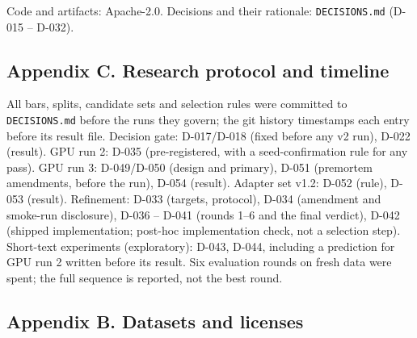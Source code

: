 \documentclass[
  10pt,
]{article}
\begin{document}
Code and artifacts: Apache-2.0. Decisions and their rationale:
\texttt{DECISIONS.md} (D-015 -- D-032).

\hypertarget{appendix-c.-research-protocol-and-timeline}{%
\subsection{Appendix C. Research protocol and
timeline}\label{appendix-c.-research-protocol-and-timeline}}

All bars, splits, candidate sets and selection rules were committed to
\texttt{DECISIONS.md} before the runs they govern; the git history
timestamps each entry before its result file. Decision gate: D-017/D-018
(fixed before any v2 run), D-022 (result). GPU run 2: D-035
(pre-registered, with a seed-confirmation rule for any pass). GPU run 3:
D-049/D-050 (design and primary), D-051 (premortem amendments, before
the run), D-054 (result). Adapter set v1.2: D-052 (rule), D-053
(result). Refinement: D-033 (targets, protocol), D-034 (amendment and
smoke-run disclosure), D-036 -- D-041 (rounds 1--6 and the final
verdict), D-042 (shipped implementation; post-hoc implementation check,
not a selection step). Short-text experiments (exploratory): D-043,
D-044, including a prediction for GPU run 2 written before its result.
Six evaluation rounds on fresh data were spent; the full sequence is
reported, not the best round.

\hypertarget{appendix-b.-datasets-and-licenses}{%
\subsection{Appendix B. Datasets and
licenses}\label{appendix-b.-datasets-and-licenses}}
\end{document}
